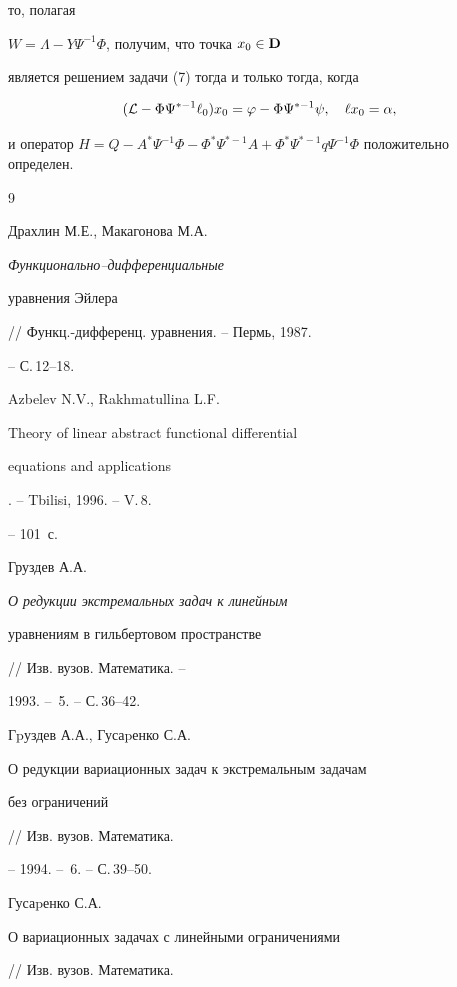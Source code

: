 то, полагая


$W=\Lambda-Y\Psi^{-1}\Phi$, получим, что точка $x_0\in\bold D$


является решением задачи (7) тогда и только тогда, когда


$$


({\cal L}-\Phi\Psi^{*-1}\ell_0)x_0=\varphi-\Phi\Psi^{*-1}\psi,\quad


\ell x_0=\alpha,


$$


и оператор $H=Q-A^*\Psi^{-1}\Phi-\Phi^*\Psi^{*-1}A+


\Phi^*\Psi^{*-1}q\Psi^{-1}\Phi$ положительно определен.








\begin{thebibliography}{9}







Драхлин М.Е., Макагонова М.А. {\em Функционально--дифференциальные


уравнения Эйлера} // Функц.-дифференц. уравнения. -- Пермь, 1987.


-- С.\,12--18.




Azbelev N.V., Rakhmatullina L.F. {\em


Theory of linear abstract functional differential


equations and applications}. -- Tbilisi, 1996. -- V.\,8.


-- 101~с.




Груздев А.А. {\em О редукции экстремальных задач к линейным


уравнениям в гильбертовом пространстве} // Изв. вузов. Математика. --


1993. -- \No\,5. -- С.\,36--42.




Гpуздев А.А., Гусаpенко С.А. {\em


О редукции вариационных задач к экстремальным задачам


без ограничений} // Изв. вузов. Математика.


-- 1994. -- \No\,6. -- С.\,39--50.




Гусаpенко С.А. {\em


О вариационных задачах с линейными ограничениями} // Изв. вузов. Математика.



\end{thebibliography}
